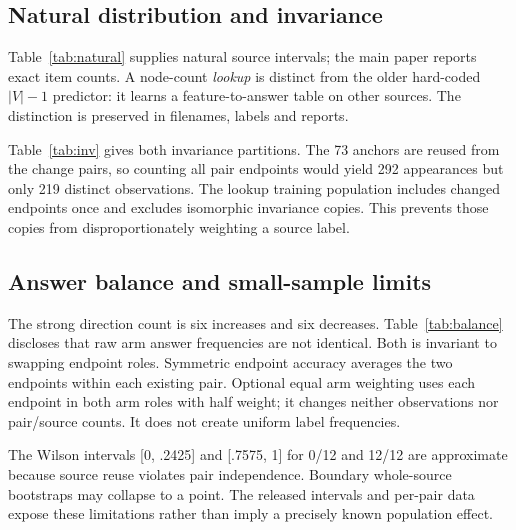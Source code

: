 \documentclass[10pt,twocolumn,letterpaper]{article}
\begin{document}
\subsection{Natural distribution and invariance}
Table~\ref{tab:natural} supplies natural source intervals; the main
paper reports exact item counts. A node-count \emph{lookup} is
distinct from the older hard-coded $|V|-1$ predictor: it learns a
feature-to-answer table on other sources. The distinction is preserved
in filenames, labels and reports.

Table~\ref{tab:inv} gives both invariance partitions. The 73 anchors
are reused from the change pairs, so counting all pair endpoints
would yield 292 appearances but only 219 distinct observations.
The lookup training population includes changed endpoints once and
excludes isomorphic invariance copies. This prevents those copies
from disproportionately weighting a source label.

\begin{table}[H]
\centering\small
\caption{Both-correct on invariance pairs. Strong and degree-visible
sources overlap with the corresponding changed-answer partitions.
Stable predictions need not be correct.}
\label{tab:inv}

\end{table}

\subsection{Answer balance and small-sample limits}
The strong direction count is six increases and six decreases.
Table~\ref{tab:balance} discloses that raw arm answer frequencies
are not identical. Both is invariant to swapping endpoint roles.
Symmetric endpoint accuracy averages the two endpoints within
each existing pair. Optional equal arm weighting uses each endpoint
in both arm roles with half weight; it changes neither observations
nor pair/source counts. It does not create uniform label frequencies.

\begin{table}[H]
\centering\small
\caption{Stored strong-change answer histograms. Equal numbers of
increases/decreases do not imply equal per-answer arm frequencies.}
\label{tab:balance}

\end{table}

The Wilson intervals [0, .2425] and [.7575, 1] for 0/12 and 12/12
are approximate because source reuse violates pair independence.
Boundary whole-source bootstraps may collapse to a point. The
released intervals and per-pair data expose these limitations rather
than imply a precisely known population effect.
\end{document}
